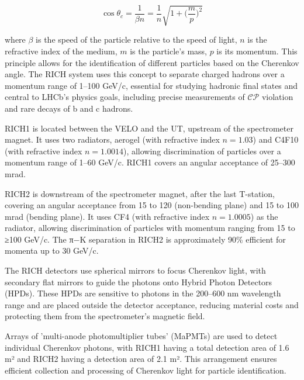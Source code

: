 \begin{equation}
    \cos\theta_c=\frac{1}{\beta n} = \frac{1}{n}\sqrt{1+\biggl(\frac{m}{p}\biggr)^2}
\end{equation}

where $\beta$ is the speed of the particle relative to the speed of light, $n$ is the refractive index of the medium, $m$ is the particle's mass, $p$ is its momentum.
This principle allows for the identification of different particles based on the Cherenkov angle. The RICH system uses this concept to separate charged hadrons over a momentum range of 1–100 GeV/c, essential for studying hadronic final states and central to LHCb's physics goals, including precise measurements of $\mathcal{CP}$ violation and rare decays of b and c hadrons.

RICH1 is located between the VELO and the UT, upstream of the spectrometer magnet. It uses two radiators, aerogel (with refractive index $n=1.03$) and C4F10 (with refractive index $n=1.0014$), allowing discrimination of particles over a momentum range of 1–60 GeV/c. RICH1 covers an angular acceptance of 25–300 mrad.

RICH2 is downstream of the spectrometer magnet, after the last T-station, covering an angular acceptance from 15 to 120 (non-bending plane) and 15 to 100 mrad (bending plane). It uses CF4 (with refractive index $n=1.0005$) as the radiator, allowing discrimination of particles with momentum ranging from 15 to ≥100 GeV/c. The π−K separation in RICH2 is approximately 90\% efficient for momenta up to 30 GeV/c.

The RICH detectors use spherical mirrors to focus Cherenkov light, with secondary flat mirrors to guide the photons onto Hybrid Photon Detectors (HPDs). These HPDs are sensitive to photons in the 200–600 nm wavelength range and are placed outside the detector acceptance, reducing material costs and protecting them from the spectrometer's magnetic field.

Arrays of 'multi-anode photomultiplier tubes' (MaPMTs) are used to detect individual Cherenkov photons, with RICH1 having a total detection area of 1.6 m² and RICH2 having a detection area of 2.1 m². This arrangement ensures efficient collection and processing of Cherenkov light for particle identification.

